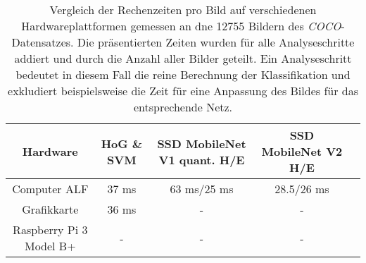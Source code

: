 \begin{table}[H]
	\caption{Vergleich der Rechenzeiten pro Bild auf verschiedenen Hardwareplattformen gemessen an dne 12755 Bildern des \textit{COCO}-Datensatzes. Die präsentierten Zeiten wurden für alle Analyseschritte addiert und durch die Anzahl aller Bilder geteilt. Ein Analyseschritt bedeutet in diesem Fall die reine Berechnung der Klassifikation und exkludiert beispielsweise die Zeit für eine Anpassung des Bildes für das entsprechende Netz.  }
	\begin{center}
		\begin{tabular}{|c|c|c|c|c|}
			\hline
			\multicolumn{1}{|c|}{Hardware} & \multicolumn{1}{c|}{HoG \& SVM} & \multicolumn{1}{c|}{SSD MobileNet V1 quant. H/E} & \multicolumn{1}{c|}{SSD MobileNet V2 H/E} \\ \hline
			Computer ALF	&37 ms 	&63 ms/25 ms		& 28.5/26 ms 	 \\
			Grafikkarte			&36 ms	&-		& 	-  	 \\
			Raspberry Pi 3 Model B+			&-	&-		&- \\
			
			\hline
		\end{tabular}
	\end{center}

	\label{fig: zeitentab}
\end{table}